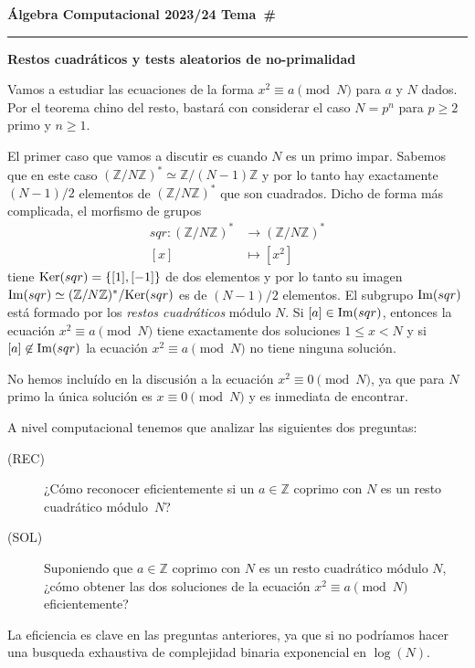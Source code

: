 \documentclass[a4paper, 11pt]{article}
\newcommand{\ZZ}{\mathbb{Z}}
\newcounter{numerodetema}
\newcommand\tema[1]{{\eject\stepcounter{numerodetema}\bf Álgebra Computacional
2023/24 \hfill Tema~\#\arabic{numerodetema}}\par\smallskip\hrule\bigskip\par
\begin{center}{\Large\bf #1}\end{center}}
\theoremstyle{plain}
\theoremstyle{definition}
\begin{document}
\setcounter{numerodetema}{4}
\tema{Restos cuadráticos y tests aleatorios de no-primalidad}

Vamos a estudiar las ecuaciones de la forma $x^2\equiv a\pmod{N}$
para $a$ y $N$ dados. Por el teorema chino del resto, bastará con considerar
el caso $N=p^n$ para $p\geq 2$ primo y $n\geq 1$.

\bigskip

El primer caso que vamos a discutir es cuando $N$ es un primo impar. Sabemos que en
este caso $(\ZZ/N\ZZ)^*\simeq\ZZ/(N-1)\ZZ$ y por lo tanto hay exactamente $(N-1)/2$
elementos de $(\ZZ/N\ZZ)^*$ que son cuadrados. Dicho de forma más complicada,
el morfismo de grupos
\[
\begin{aligned}
   sqr:(\ZZ/N\ZZ)^* &\rightarrow(\ZZ/N\ZZ)^* \\
   [x] &\mapsto [x^2]
\end{aligned}
\]
tiene ${\rm Ker}(sqr)=\{[1],[-1]\}$ de dos elementos y por lo tanto
su imagen ${\rm Im}(sqr)\simeq (\ZZ/N\ZZ)^*/{\rm Ker}(sqr)$ es de $(N-1)/2$
elementos. El subgrupo ${\rm Im}(sqr)$ está formado por los \emph{restos
cuadráticos} módulo $N$. Si $[a]\in{\rm Im}(sqr)$, entonces la ecuación
$x^2\equiv a\pmod{N}$ tiene exactamente dos soluciones $1\leq x<N$ y si
$[a]\not\in{\rm Im}(sqr)$ la ecuación $x^2\equiv a\pmod{N}$ no tiene
ninguna solución.

\bigskip

No hemos incluído en la discusión a la ecuación $x^2\equiv0\pmod{N}$, ya que
para $N$ primo la única solución es $x\equiv 0\pmod{N}$ y es inmediata de
encontrar.

\bigskip

A nivel computacional tenemos que analizar las siguientes dos preguntas:
\begin{description}
\item[(REC)] ¿Cómo reconocer eficientemente si un $a\in\ZZ$ coprimo con $N$ es
un resto cuadrático módulo~$N$?
\item[(SOL)] Suponiendo que $a\in\ZZ$ coprimo con $N$ es un resto cuadrático
módulo $N$, ¿cómo obtener las dos soluciones de la ecuación $x^2\equiv a\pmod{N}$
eficientemente?
\end{description}
La eficiencia es clave en las preguntas anteriores, ya que si no podríamos
hacer una busqueda exhaustiva de complejidad binaria exponencial en $\log(N)$.
\end{document}
